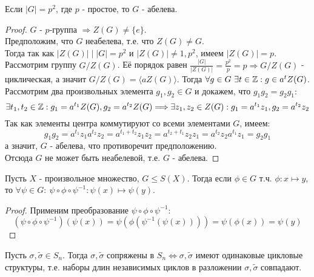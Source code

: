 \begin{consequense}
    Если $|G| = p^2$, где $p$ - простое, то $G$ - абелева.
\end{consequense}
\begin{proof}
    $G$ - $p$-группа $\Longrightarrow Z(G) \neq \{e\}$.\\
    Предположим, что $G$ неабелева, т.е. что $Z(G) \neq G$. \\
    Тогда так как $|Z(G)| \mid |G| = p^2$ и $|Z(G)| \neq 1, p^2$, имеем $|Z(G)| = p$.\\
    Рассмотрим группу $G / Z(G)$. Её порядок равен $\frac{|G|}{|Z(G)|} = \frac{p^2}{p} = p \Longrightarrow G / Z(G)$ - циклическая, а значит $G / Z(G) = \langle aZ(G) \rangle$. Тогда $\forall g \in G \ \exists t \in \mathbb{Z}: g \in a^tZ(G)$. Рассмотрим два произвольных элемента $g_1, g_2 \in G$ и докажем, что $g_1g_2 = g_2g_1$:
    \[\exists t_1, t_2 \in \mathbb{Z}: g_1 = a^{t_1}Z(G), g_2 = a^{t_2}Z(G) \Longrightarrow \exists z_1, z_2 \in Z(G):  g_1 = a^{t_1}z_1, g_2 = a^{t_2}z_2\]
    Так как элементы центра коммутируют со всеми элементами $G$, имеем:
    \[g_1g_2 = a^{t_1}z_1a^{t_2}z_2 = a^{t_1 + t_2}z_1z_2 = a^{t_2 + t_1}z_2z_1 = a^{t_2}z_2a^{t_1}z_1 = g_2g_1\]
    а значит, $G$ - абелева, что противоречит предположению.\\
    Отсюда $G$ не может быть неабелевой, т.е. $G$ - абелева. 
\end{proof}
\begin{lemmanum}
    Пусть $X$ - произвольное множество, $G \leq S(X)$. Тогда если $\phi \in G$ т.ч. $\phi: x \mapsto y$, то $\forall \psi \in G: \ \psi \circ \phi \circ \psi^{-1}: \psi(x) \mapsto \psi(y)$.
\end{lemmanum}
\begin{proof}
    Применим преобразование $\psi \circ \phi \circ \psi^{-1}$:
    \[(\psi \circ \phi \circ \psi^{-1})(\psi(x)) = \psi (\phi (\psi^{-1}(\psi(x)))) = \psi(\phi(x)) = \psi(y)\]
\end{proof}
\begin{subtheoremnum}
    Пусть $\sigma, \tilde{\sigma} \in S_n$. Тогда $\sigma, \tilde{\sigma}$ сопряжены в $S_n \Longleftrightarrow \sigma, \tilde{\sigma}$ имеют одинаковые цикловые структуры, т.е. наборы длин независимых циклов в разложении $\sigma, \tilde{\sigma}$ совпадают.
\end{subtheoremnum}
